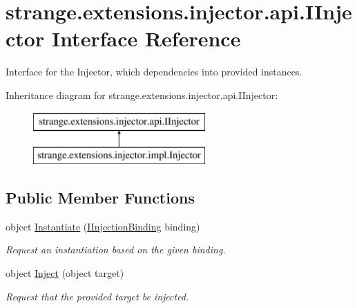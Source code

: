 \hypertarget{interfacestrange_1_1extensions_1_1injector_1_1api_1_1_i_injector}{\section{strange.\-extensions.\-injector.\-api.\-I\-Injector Interface Reference}
\label{interfacestrange_1_1extensions_1_1injector_1_1api_1_1_i_injector}
}


Interface for the Injector, which dependencies into provided instances.  


Inheritance diagram for strange.\-extensions.\-injector.\-api.\-I\-Injector\-:\begin{figure}[H]
\begin{center}
\leavevmode
\includegraphics[height=2.000000cm]{interfacestrange_1_1extensions_1_1injector_1_1api_1_1_i_injector}
\end{center}
\end{figure}
\subsection*{Public Member Functions}
\begin{DoxyCompactItemize}
\item 
object \hyperlink{interfacestrange_1_1extensions_1_1injector_1_1api_1_1_i_injector_ab6c185a183b27708e38c4954195fe591}{Instantiate} (\hyperlink{interfacestrange_1_1extensions_1_1injector_1_1api_1_1_i_injection_binding}{I\-Injection\-Binding} binding)
\begin{DoxyCompactList}\small\item\em Request an instantiation based on the given binding. \end{DoxyCompactList}\item 
\hypertarget{interfacestrange_1_1extensions_1_1injector_1_1api_1_1_i_injector_a3c4b0fc21caebeafe42ad797001181e8}{object \hyperlink{interfacestrange_1_1extensions_1_1injector_1_1api_1_1_i_injector_a3c4b0fc21caebeafe42ad797001181e8}{Inject} (object target)}\label{interfacestrange_1_1extensions_1_1injector_1_1api_1_1_i_injector_a3c4b0fc21caebeafe42ad797001181e8}

\begin{DoxyCompactList}\small\item\em Request that the provided target be injected. \end{DoxyCompactList}\end{DoxyCompactItemize}
